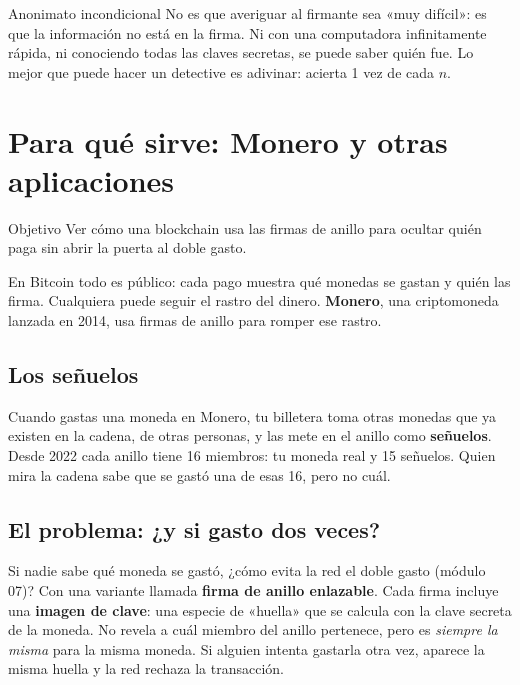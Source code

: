 \documentclass[11pt,a4paper]{article}
\theoremstyle{definition}
\theoremstyle{plain}
\theoremstyle{remark}
\begin{document}
\begin{clave}{Anonimato incondicional}
No es que averiguar al firmante sea «muy difícil»: es que la información no está en
la firma. Ni con una computadora infinitamente rápida, ni conociendo todas las
claves secretas, se puede saber quién fue. Lo mejor que puede hacer un detective es
adivinar: acierta 1 vez de cada $n$.
\end{clave}

\section{Para qué sirve: Monero y otras aplicaciones}\label{sec:blockchain}

\begin{nota}{Objetivo}
Ver cómo una blockchain usa las firmas de anillo para ocultar quién paga sin abrir
la puerta al doble gasto.
\end{nota}

En Bitcoin todo es público: cada pago muestra qué monedas se gastan y quién las
firma. Cualquiera puede seguir el rastro del dinero. \textbf{Monero}, una
criptomoneda lanzada en 2014, usa firmas de anillo para romper ese rastro.

\subsection{Los señuelos}

Cuando gastas una moneda en Monero, tu billetera toma otras monedas que ya existen
en la cadena, de otras personas, y las mete en el anillo como \textbf{señuelos}.
Desde 2022 cada anillo tiene 16 miembros: tu moneda real y 15 señuelos. Quien mira
la cadena sabe que se gastó una de esas 16, pero no cuál.

\subsection{El problema: ¿y si gasto dos veces?}

Si nadie sabe qué moneda se gastó, ¿cómo evita la red el doble gasto (módulo 07)?
Con una variante llamada \textbf{firma de anillo enlazable}. Cada firma incluye una
\textbf{imagen de clave}: una especie de «huella» que se calcula con la clave
secreta de la moneda. No revela a cuál miembro del anillo pertenece, pero es
\emph{siempre la misma} para la misma moneda. Si alguien intenta gastarla otra vez,
aparece la misma huella y la red rechaza la transacción.
\end{document}
